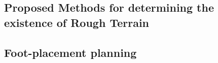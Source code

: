 		\subsection{Proposed Methods for determining the existence of Rough Terrain}

		\subsection{Foot-placement planning}


